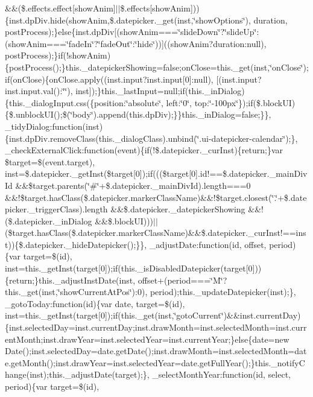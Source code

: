 {{\begin{DoxyParamCaption}
\&\&(\$.\+effects.\+effect\mbox{[}show\+Anim\mbox{]}$\vert$$\vert$\$.\+effects\mbox{[}show\+Anim\mbox{]}))\{inst.\+dp\+Div.\+hide(show\+Anim,\$.\+datepicker.\+\_\+get(inst,\char`\"{}show\+Options\char`\"{}), duration, post\+Process);\}else\{inst.\+dp\+Div\mbox{[}(show\+Anim===\char`\"{}slide\+Down\char`\"{}?\char`\"{}slide\+Up\char`\"{}\+:(show\+Anim===\char`\"{}fade\+In\char`\"{}?\char`\"{}fade\+Out\char`\"{}\+:\char`\"{}hide\char`\"{}))\mbox{]}((show\+Anim?duration\+:null), post\+Process);\}if(!show\+Anim)\{post\+Process();\}this.\+\_\+datepicker\+Showing=false;on\+Close=this.\+\_\+get(inst,\char`\"{}on\+Close\char`\"{});if(on\+Close)\{on\+Close.\+apply((inst.\+input?inst.\+input\mbox{[}0\mbox{]}\+:null), \mbox{[}(inst.\+input?inst.\+input.\+val()\+:\char`\"{}\char`\"{}), inst\mbox{]});\}this.\+\_\+last\+Input=null;if(this.\+\_\+in\+Dialog)\{this.\+\_\+dialog\+Input.\+css(\{position\+:\char`\"{}absolute\char`\"{}, left\+:\char`\"{}0\char`\"{}, top\+:\char`\"{}-\/100px\char`\"{}\});if(\$.\+block\+U\+I)\{\$.\+unblock\+U\+I();\$(\char`\"{}body\char`\"{}).\+append(this.\+dp\+Div);\}\}this.\+\_\+in\+Dialog=false;\}\}, \+\_\+tidy\+Dialog\+:function(inst)\{inst.\+dp\+Div.\+remove\+Class(this.\+\_\+dialog\+Class).\+unbind(\char`\"{}.\+ui-\/datepicker-\/calendar\char`\"{});\}, \+\_\+check\+External\+Click\+:function(event)\{if(!\$.\+datepicker.\+\_\+cur\+Inst)\{return;\}var \$target=\$(event.\+target), inst=\$.\+datepicker.\+\_\+get\+Inst(\$target\mbox{[}0\mbox{]});if(((\$target\mbox{[}0\mbox{]}.\+id!==\$.\+datepicker.\+\_\+main\+Div\+Id \&\&\$target.\+parents(\char`\"{}\#\char`\"{}+\$.\+datepicker.\+\_\+main\+Div\+Id).\+length===0 \&\&!\$target.\+has\+Class(\$.\+datepicker.\+marker\+Class\+Name)\&\&!\$target.\+closest(\char`\"{}.\char`\"{}+\$.\+datepicker.\+\_\+trigger\+Class).\+length \&\&\$.\+datepicker.\+\_\+datepicker\+Showing \&\&!(\$.\+datepicker.\+\_\+in\+Dialog \&\&\$.\+block\+U\+I)))$\vert$$\vert$(\$target.\+has\+Class(\$.\+datepicker.\+marker\+Class\+Name)\&\&\$.\+datepicker.\+\_\+cur\+Inst!==inst))\{\$.\+datepicker.\+\_\+hide\+Datepicker();\}\}, \+\_\+adjust\+Date\+:function(id, offset, period)\{var target=\$(id), inst=this.\+\_\+get\+Inst(target\mbox{[}0\mbox{]});if(this.\+\_\+is\+Disabled\+Datepicker(target\mbox{[}0\mbox{]}))\{return;\}this.\+\_\+adjust\+Inst\+Date(inst, offset+(period===\char`\"{}\+M\char`\"{}?this.\+\_\+get(inst,\char`\"{}show\+Current\+At\+Pos\char`\"{})\+:0), period);this.\+\_\+update\+Datepicker(inst);\}, \+\_\+goto\+Today\+:function(id)\{var date, target=\$(id), inst=this.\+\_\+get\+Inst(target\mbox{[}0\mbox{]});if(this.\+\_\+get(inst,\char`\"{}goto\+Current\char`\"{})\&\&inst.\+current\+Day)\{inst.\+selected\+Day=inst.\+current\+Day;inst.\+draw\+Month=inst.\+selected\+Month=inst.\+current\+Month;inst.\+draw\+Year=inst.\+selected\+Year=inst.\+current\+Year;\}else\{date=new Date();inst.\+selected\+Day=date.\+get\+Date();inst.\+draw\+Month=inst.\+selected\+Month=date.\+get\+Month();inst.\+draw\+Year=inst.\+selected\+Year=date.\+get\+Full\+Year();\}this.\+\_\+notify\+Change(inst);this.\+\_\+adjust\+Date(target);\}, \+\_\+select\+Month\+Year\+:function(id, select, period)\{var target=\$(id), 
\end{DoxyParamCaption}}}
